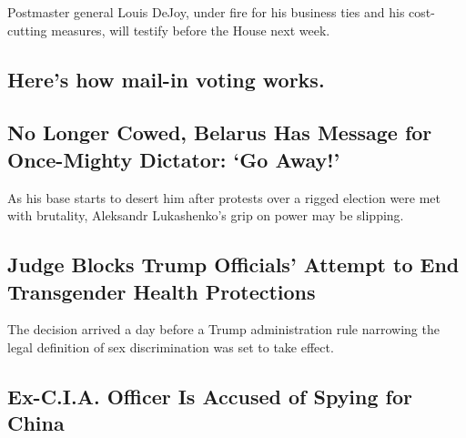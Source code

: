 Postmaster general Louis DeJoy, under fire for his business ties and his
cost-cutting measures, will testify before the House next week.

\href{/article/Vote-by-mail.html}{}

\hypertarget{heres-how-mail-in-voting-works}{%
\subsection{Here's how mail-in voting
works.}\label{heres-how-mail-in-voting-works}}

\href{/2020/08/17/world/europe/belarus-lukashenko-protests.html}{}

\hypertarget{no-longer-cowed-belarus-has-message-for-once-mighty-dictator-go-away}{%
\subsection{No Longer Cowed, Belarus Has Message for Once-Mighty
Dictator: `Go
Away!'}\label{no-longer-cowed-belarus-has-message-for-once-mighty-dictator-go-away}}

\href{/2020/08/17/world/europe/belarus-lukashenko-protests.html}{}

As his base starts to desert him after protests over a rigged election
were met with brutality, Aleksandr Lukashenko's grip on power may be
slipping.

\href{/2020/08/17/us/politics/trump-court-transgender-rights.html}{}

\hypertarget{judge-blocks-trump-officials-attempt-to-end-transgender-health-protections}{%
\subsection{Judge Blocks Trump Officials' Attempt to End Transgender
Health
Protections}\label{judge-blocks-trump-officials-attempt-to-end-transgender-health-protections}}

The decision arrived a day before a Trump administration rule narrowing
the legal definition of sex discrimination was set to take effect.

\href{/2020/08/17/us/politics/china-spying-alexander-yuk-ching-ma.html}{}

\hypertarget{ex-cia-officer-is-accused-of-spying-for-china}{%
\subsection{Ex-C.I.A. Officer Is Accused of Spying for
China}\label{ex-cia-officer-is-accused-of-spying-for-china}}

